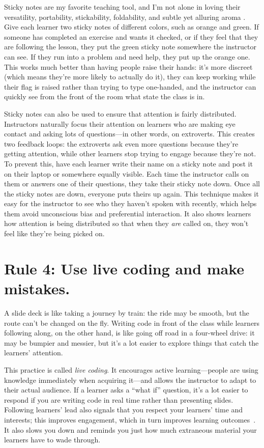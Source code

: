 \documentclass[10pt,letterpaper]{article}
\newcommand{\rulemajor}[1]{\section{#1}}
\begin{document}
Sticky notes are my favorite teaching tool,
and I'm not alone in loving their versatility,
portability, stickability, foldability,
and subtle yet alluring aroma \cite{Ward2015}.
Give each learner two sticky notes of different colors,
such as orange and green.
If someone has completed an exercise and wants it checked,
or if they feel that they are following the lesson,
they put the green sticky note somewhere the instructor can see.
If they run into a problem and need help,
they put up the orange one.
This works much better than having people raise their hands:
it's more discreet (which means they're more likely to actually do it),
they can keep working while their flag is raised rather than trying to type one-handed,
and the instructor can quickly see from the front of the room what state the class is in.

Sticky notes can also be used to ensure that attention is fairly distributed.
Instructors naturally focus their attention on learners
who are making eye contact and asking lots of questions---in other words, on extroverts.
This creates two feedback loops:
the extroverts ask even more questions because they're getting attention,
while other learners stop trying to engage because they're not.
To prevent this,
have each learner write their name on a sticky note
and post it on their laptop or somewhere equally visible.
Each time the instructor calls on them or answers one of their questions,
they take their sticky note down.
Once all the sticky notes are down,
everyone puts theirs up again.
This technique makes it easy for the instructor to see who they haven't spoken with recently,
which helps them avoid unconscious bias and preferential interaction.
It also shows learners how attention is being distributed
so that when they \emph{are} called on,
they won't feel like they're being picked on.

\rulemajor{Rule 4: Use live coding and make mistakes.}

A slide deck is like taking a journey by train:
the ride may be smooth,
but the route can't be changed on the fly.
Writing code in front of the class while learners following along,
on the other hand,
is like going off road in a four-wheel drive:
it may be bumpier and messier,
but it's a lot easier to explore things that catch the learners' attention.

This practice is called \emph{live coding}.
It encourages active learning---people are using knowledge immediately
when acquiring it---and allows the instructor to adapt to their actual audience.
If a learner asks a ``what if'' question,
it's a lot easier to respond if you are writing code in real time
rather than presenting slides.
Following learners' lead also signals that you respect your learners' time and interests;
this improves engagement,
which in turn improves learning outcomes~\cite{Wlod2017}.
It also slows you down
and reminds you just how much extraneous material your learners have to wade through.
\end{document}
